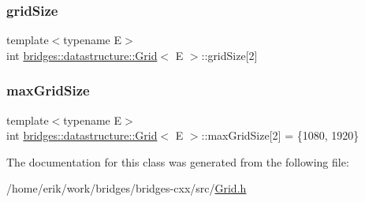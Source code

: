 \subsubsection{\texorpdfstring{grid\+Size}{gridSize}}
{\footnotesize\ttfamily template$<$typename E$>$ \\
int \hyperlink{classbridges_1_1datastructure_1_1_grid}{bridges\+::datastructure\+::\+Grid}$<$ E $>$\+::grid\+Size\mbox{[}2\mbox{]}\hspace{0.3cm}{\ttfamily [protected]}}

\mbox{\label{classbridges_1_1datastructure_1_1_grid_acb1cca7db5fb42a0b107885f9e00ff67}} 
\subsubsection{\texorpdfstring{max\+Grid\+Size}{maxGridSize}}
{\footnotesize\ttfamily template$<$typename E$>$ \\
int \hyperlink{classbridges_1_1datastructure_1_1_grid}{bridges\+::datastructure\+::\+Grid}$<$ E $>$\+::max\+Grid\+Size\mbox{[}2\mbox{]} = \{1080, 1920\}\hspace{0.3cm}{\ttfamily [protected]}}



The documentation for this class was generated from the following file\+:\begin{DoxyCompactItemize}
\item 
/home/erik/work/bridges/bridges-\/cxx/src/\hyperlink{_grid_8h}{Grid.\+h}\end{DoxyCompactItemize}
